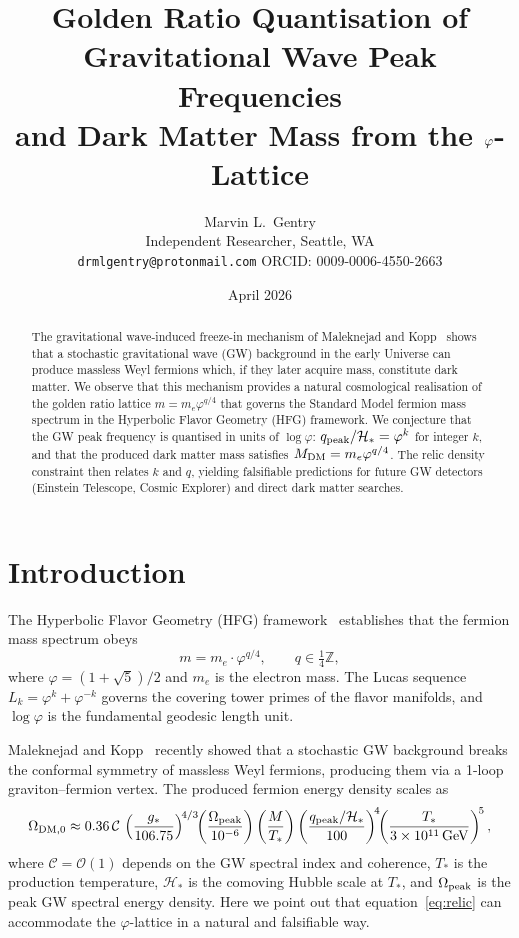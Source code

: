 \documentclass[12pt]{article}
\title{Golden Ratio Quantisation of Gravitational Wave Peak Frequencies\\
and Dark Matter Mass from the $\ph$-Lattice}
\author{Marvin L.\ Gentry\\
\small Independent Researcher, Seattle, WA\\
\small \texttt{drmlgentry@protonmail.com}\quad
ORCID: 0009-0006-4550-2663}
\date{April 2026}
\theoremstyle{definition}
\newcommand{\ph}{\varphi}
\newcommand{\Hstar}{\mathcal{H}_*}
\begin{document}
\maketitle

\begin{abstract}
The gravitational wave-induced freeze-in mechanism of Maleknejad and
Kopp~\cite{MaleknejadKopp2026} shows that a stochastic gravitational
wave (GW) background in the early Universe can produce massless Weyl
fermions which, if they later acquire mass, constitute dark matter.
We observe that this mechanism provides a natural cosmological
realisation of the golden ratio lattice $m = m_e\ph^{q/4}$ that
governs the Standard Model fermion mass spectrum in the Hyperbolic
Flavor Geometry (HFG) framework.
We conjecture that the GW peak frequency is quantised in units of
$\log\ph$: $q_{\rm peak}/\Hstar = \ph^k$ for integer $k$, and that
the produced dark matter mass satisfies $M_{\rm DM} = m_e\ph^{q/4}$.
The relic density constraint then relates $k$ and $q$, yielding
falsifiable predictions for future GW detectors (Einstein Telescope,
Cosmic Explorer) and direct dark matter searches.
\end{abstract}

\section{Introduction}

The Hyperbolic Flavor Geometry (HFG) framework~\cite{Gentry:Lucas,
Gentry:SU} establishes that the fermion mass spectrum obeys
\begin{equation}
  m = m_e \cdot \ph^{q/4},\qquad q \in \tfrac{1}{4}\mathbb{Z},
  \label{eq:lattice}
\end{equation}
where $\ph=(1+\sqrt5)/2$ and $m_e$ is the electron mass.
The Lucas sequence $L_k = \ph^k + \ph^{-k}$ governs the covering
tower primes of the flavor manifolds, and $\log\ph$ is the
fundamental geodesic length unit.

Maleknejad and Kopp~\cite{MaleknejadKopp2026} recently showed that
a stochastic GW background breaks the conformal symmetry of massless
Weyl fermions, producing them via a 1-loop graviton--fermion vertex.
The produced fermion energy density scales as~\cite{MaleknejadKopp2026}
\begin{equation}
  \Omega_{\rm DM,0} \approx 0.36\,\mathcal{C}\,
  \left(\frac{g_*}{106.75}\right)^{\!4/3}
  \!\!\left(\frac{\Omega_{\rm peak}}{10^{-6}}\right)
  \left(\frac{M}{T_*}\right)
  \left(\frac{q_{\rm peak}/\Hstar}{100}\right)^{\!4}
  \!\!\left(\frac{T_*}{3\times10^{11}\,{\rm GeV}}\right)^{\!5},
  \label{eq:relic}
\end{equation}
where $\mathcal{C}=\mathcal{O}(1)$ depends on the GW spectral index
and coherence, $T_*$ is the production temperature, $\Hstar$ is the
comoving Hubble scale at $T_*$, and $\Omega_{\rm peak}$ is the peak
GW spectral energy density.
Here we point out that equation~\eqref{eq:relic} can accommodate
the $\ph$-lattice in a natural and falsifiable way.
\end{document}
